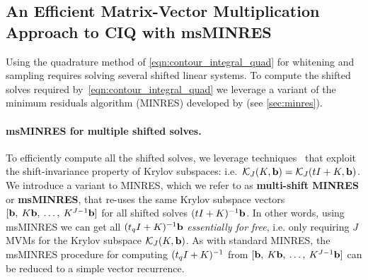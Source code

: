 \subsection{An Efficient Matrix-Vector Multiplication Approach to CIQ with msMINRES}
%
Using the quadrature method of \cref{eqn:contour_integral_quad} for whitening and sampling requires solving several shifted linear systems.
To compute the shifted solves required by~\cref{eqn:contour_integral_quad} we leverage a variant of the
minimum residuals algorithm (MINRES) developed by \citet{paige1975solution} (see \cref{sec:minres}).

\paragraph{msMINRES for multiple shifted solves.}
To efficiently compute all the shifted solves, we leverage techniques~\citep[e.g.][]{datta1991arnoldi,freund1990conjugate,meerbergen2003solution} that exploit the shift-invariance property of Krylov subspaces: i.e.~$\mathcal{K}_J(K, \mathbf{b}) = \mathcal{K}_J(t I +  K, \mathbf{b})$.
We introduce a variant to MINRES, which we refer to as {\bf multi-shift MINRES} or {\bf msMINRES}, that re-uses the same Krylov subspace vectors $[\mathbf{b}, \: K \mathbf{b}, \: \ldots, \: K^{J-1} \mathbf{b}]$ for all shifted solves $(t I + K)^{-1} \mathbf{b}$.
In other words, using msMINRES we can get all $(t_q I + K)^{-1} \mathbf{b}$ \emph{essentially for free}, i.e. only requiring $J$ MVMs for the Krylov subspace $\mathcal{K}_J(K, \mathbf{b})$.
As with standard MINRES, the msMINRES procedure for computing $(t_q I + K)^{-1}$ from $[\mathbf{b}, \: K \mathbf{b}, \: \ldots, \: K^{J-1} \mathbf{b}]$ can be reduced to a simple vector recurrence.

